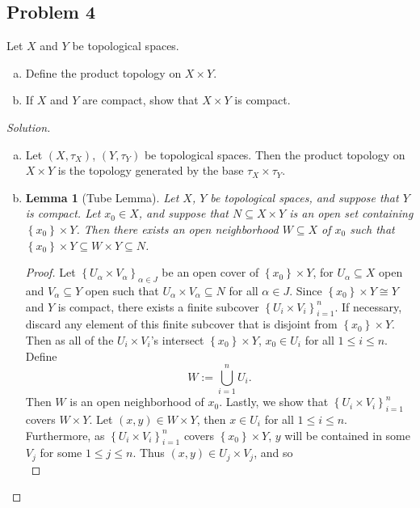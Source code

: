 \documentclass[12pt]{article}
\newcommand\setb[1]{\left \{ #1 \right \}}
\newtheorem{lemma}[theorem]{Lemma}
\theoremstyle{definition}
\begin{document}
\subsection{Problem 4 \texorpdfstring{\cite{Munkres}}{}}
Let $X$ and $Y$ be topological spaces.
\begin{enumerate}[a)]
    \item Define the product topology on $X \times Y$.
    \item If $X$ and $Y$ are compact, show that $X \times Y$ is compact.
\end{enumerate}
\begin{proof}[Solution]
    \noindent
    \begin{enumerate}[a)]
        \item Let $(X,\tau_X)$, $(Y,\tau_Y)$ be topological spaces. Then the product topology on $X \times Y$ is the topology generated by the base $\tau_X \times \tau_Y$.
        \item 
        \begin{lemma}[Tube Lemma]
            Let $X$, $Y$ be topological spaces, and suppose that $Y$ is compact. Let $x_0 \in X$, and suppose that $N \subseteq X \times Y$ is an open set containing $\setb{ x_0 } \times Y$. Then there exists an open neighborhood $W \subseteq X$ of $x_0$ such that $\setb{ x_0 } \times Y \subseteq W \times Y \subseteq N$.
        \end{lemma}
        \begin{proof}
            Let $\setb{ U_{\alpha} \times V_{\alpha} }_{\alpha \in J}$ be an open cover of $\setb{ x_0 } \times Y$, for $U_{\alpha} \subseteq X$ open and $V_{\alpha} \subseteq Y$ open such that $U_{\alpha} \times V_{\alpha} \subseteq N$ for all $\alpha \in J$. Since $\setb{ x_0 } \times Y \cong Y$ and $Y$ is compact, there exists a finite subcover $\setb{ U_i \times V_i }_{i = 1}^n$. If necessary, discard any element of this finite subcover that is disjoint from $\setb{ x_0 } \times Y$. Then as all of the $U_i \times V_i$'s intersect $\setb{ x_0 } \times Y$, $x_0 \in U_i$ for all $1 \leq i \leq n$. Define 
            \[
                W := \bigcup\limits_{i = 1}^n U_i.
            \]
            Then $W$ is an open neighborhood of $x_0$. Lastly, we show that $\setb{ U_i \times V_i }_{i = 1}^n$ covers $W \times Y$. Let $(x,y) \in W \times Y$, then $x \in U_i$ for all $1 \leq i \leq n$. Furthermore, as $\setb{ U_i \times V_i }_{i = 1}^n$ covers $\setb{ x_0 } \times Y$, $y$ will be contained in some $V_j$ for some $1 \leq j \leq n$. Thus $(x,y) \in U_j \times V_j$, and so \[
\]
\end{proof}
\end{enumerate}
\end{proof}
\end{document}

